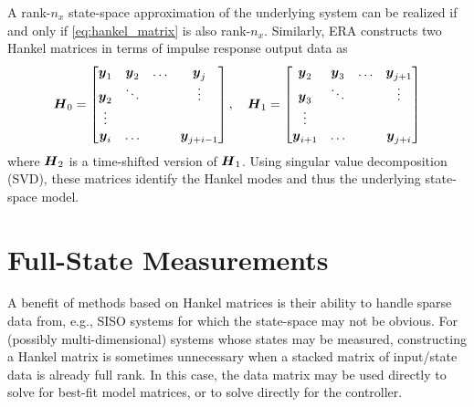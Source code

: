 A rank-$n_{x}$ state-space approximation of the underlying system can be realized if and only if \eqref{eq:hankel_matrix} is also rank-$n_{x}$.  Similarly, ERA constructs two Hankel matrices in terms of impulse response output data as
\begin{equation}
\label{eq:era_hankel_matrices}
\begin{aligned}
    \vb*{H}_{0} = 
    \begin{bmatrix}
        \vb*{y}_{1} & \vb*{y}_{2} & \ldots & \vb*{y}_{j}\\
        \vb*{y}_{2} & \ddots &  & \vdots\\
        \vdots & & & \\
        \vb*{y}_{i} & \ldots &  & \vb*{y}_{j+i-1}
    \end{bmatrix}, \hspace{10pt}
    \vb*{H}_{1} = 
    \begin{bmatrix}
        \vb*{y}_{2} & \vb*{y}_{3} & \ldots & \vb*{y}_{j+1}\\
        \vb*{y}_{3} & \ddots &  & \vdots\\
        \vdots & & & \\
        \vb*{y}_{i+1} & \ldots &  & \vb*{y}_{j+i}
    \end{bmatrix}
\end{aligned}
\end{equation}
where $\vb*{H}_{2}$ is a time-shifted version of $\vb*{H}_{1}$.  Using singular value decomposition (SVD), these matrices identify the Hankel modes and thus the underlying state-space model.

\section{Full-State Measurements}
A benefit of methods based on Hankel matrices is their ability to handle sparse data from, e.g., SISO systems for which the state-space may not be obvious.  For (possibly multi-dimensional) systems whose states may be measured, constructing a Hankel matrix is sometimes unnecessary when a stacked matrix of input/state data is already full rank.  In this case, the data matrix may be used directly to solve for best-fit model matrices, or to solve directly for the controller.

